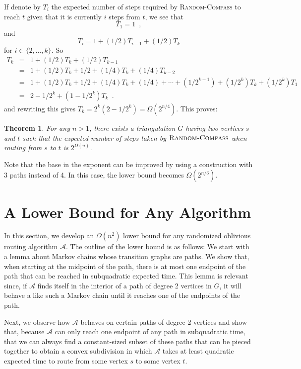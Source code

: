 \documentclass [letterpaper] {patmorin}
\newtheorem{theorem}{Theorem}%
\begin{document}
If denote by $T_i$ the expected number of steps required by \textsc{Random-Compass} to reach $t$ given that it is currently $i$ steps from $t$, we see that 
\[ 
   T_1=1 \enspace ,
\]
and 
\[
  T_i = 1 + (1/2)T_{i-1} + (1/2)T_k
\]
for $i \in \{2,\ldots, k\}$.  So 
\begin{eqnarray*}
  T_k & = & 1 + (1/2)T_k + (1/2)T_{k-1} \\
      & = & 1 + (1/2)T_k + 1/2 + (1/4)T_{k} + (1/4)T_{k-2} \\
      & = & 1 + (1/2)T_k + 1/2 + (1/4)T_{k} + (1/4)
              + \cdots  + (1/2^{k-1}) + (1/2^{k})T_{k} + (1/2^{k})T_1 \\
      & = & 2-1/2^{k} + (1-1/2^k)T_k \enspace .
\end{eqnarray*}
and rewriting this gives $T_k = 2^k(2-1/2^{k}) = \Omega(2^{n/4})$.  This proves:

\begin{theorem}
For any $n>1$, there exists a triangulation $G$ having two vertices $s$ and $t$ such that the expected number of steps taken by $\textsc{Random-Compass}$ when routing from $s$ to $t$ is $2^{\Omega(n)}$.
\end{theorem}

Note that the base in the exponent can be improved by using a construction
with 3 paths instead of 4.  In this case, the lower bound becomes
$\Omega(2^{n/3})$.

\section{A Lower Bound for Any Algorithm}

In this section, we develop an $\Omega(n^2)$ lower bound for any randomized oblivious routing algorithm $\mathcal{A}$.  The outline of the lower bound is as follows:  We start with a lemma about Markov chains whose transition graphs are paths. We show that, when starting at the midpoint of the path, there is at most one endpoint of the path that can be reached in subquadratic expected time.  This lemma is relevant since, if $\mathcal{A}$ finds itself in the interior of a path of degree 2 vertices in $G$, it will behave a like such a Markov chain until it reaches one of the endpoints of the path.

Next, we observe how $\mathcal{A}$ behaves on certain paths of degree 2 vertices and show that, because $\mathcal{A}$ can only reach one endpoint of any path in subquadratic time, that we can always find a constant-sized subset of these paths that can be pieced together to obtain a convex subdivision in which $\mathcal{A}$ takes at least quadratic expected time to route from some vertex $s$ to some vertex $t$.
\end{document}
